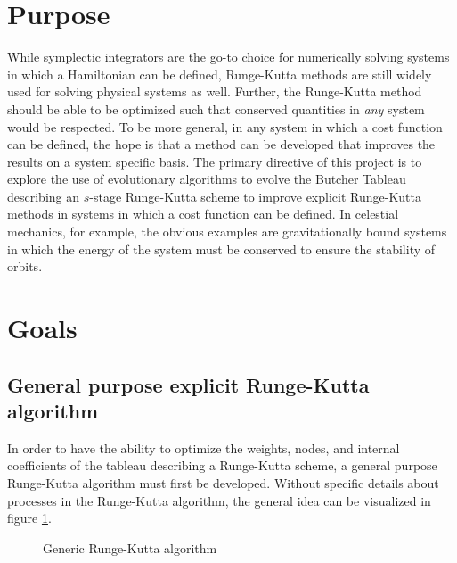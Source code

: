 \documentclass[onecolumn,titlepage,letterpaper,10pt]{article}
\begin{document}
\section{Purpose}
While symplectic integrators are the go-to choice for numerically solving
systems in which a Hamiltonian can be defined, Runge-Kutta methods are still
widely used for solving physical systems as well.
Further, the Runge-Kutta method should be able to be optimized such that conserved
quantities in \textit{any} system would be respected. To be more general, in any
system in which a cost function can be defined, the hope is that a method can be
developed that improves the results on a system specific basis.
The primary directive of this project is to explore the use of evolutionary
algorithms to evolve the Butcher Tableau describing an $s$-stage Runge-Kutta
scheme to improve explicit Runge-Kutta methods
in systems in which a cost function can be defined.
In celestial mechanics, for example, the obvious examples are gravitationally bound systems in
which the energy of the system must be conserved to ensure the stability of
orbits.

\section{Goals}
\subsection{General purpose explicit Runge-Kutta algorithm}
In order to have the ability to optimize the weights, nodes, and internal coefficients of
the tableau describing a Runge-Kutta scheme, a general purpose Runge-Kutta
algorithm must first be developed. Without specific details about processes in
the Runge-Kutta algorithm, the general idea can be visualized in figure
\ref{fig: generic rk flowchart}.
\begin{figure}[h!]
    \centering
    \caption[Generic Runge-Kutta algorithm]{Generic Runge-Kutta algorithm}
    \label{fig: generic rk flowchart}
\end{figure}
\end{document}
